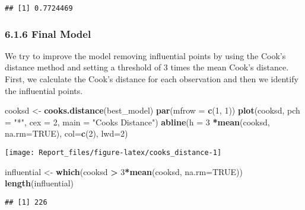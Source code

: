 \documentclass[
]{article}
\newenvironment{Shaded}{\begin{snugshade}}{\end{snugshade}}
\newcommand{\AttributeTok}[1]{\textcolor[rgb]{0.13,0.29,0.53}{#1}}
\newcommand{\ConstantTok}[1]{\textcolor[rgb]{0.56,0.35,0.01}{#1}}
\newcommand{\DecValTok}[1]{\textcolor[rgb]{0.00,0.00,0.81}{#1}}
\newcommand{\FunctionTok}[1]{\textcolor[rgb]{0.13,0.29,0.53}{\textbf{#1}}}
\newcommand{\NormalTok}[1]{#1}
\newcommand{\OtherTok}[1]{\textcolor[rgb]{0.56,0.35,0.01}{#1}}
\newcommand{\SpecialCharTok}[1]{\textcolor[rgb]{0.81,0.36,0.00}{\textbf{#1}}}
\newcommand{\StringTok}[1]{\textcolor[rgb]{0.31,0.60,0.02}{#1}}
\begin{document}
\begin{verbatim}
## [1] 0.7724469
\end{verbatim}

\hypertarget{final-model}{%
\subsubsection{6.1.6 Final Model}\label{final-model}}

We try to improve the model removing influential points by using the
Cook's distance method and setting a threshold of 3 times the mean
Cook's distance. First, we calculate the Cook's distance for each
observation and then we identify the influential points.

\begin{Shaded}
\begin{Highlighting}[]
\NormalTok{cooksd }\OtherTok{\textless{}{-}} \FunctionTok{cooks.distance}\NormalTok{(best\_model)}
\FunctionTok{par}\NormalTok{(}\AttributeTok{mfrow =} \FunctionTok{c}\NormalTok{(}\DecValTok{1}\NormalTok{, }\DecValTok{1}\NormalTok{))}
\FunctionTok{plot}\NormalTok{(cooksd, }\AttributeTok{pch =} \StringTok{"*"}\NormalTok{, }\AttributeTok{cex =} \DecValTok{2}\NormalTok{, }\AttributeTok{main =} \StringTok{"Cook\textquotesingle{}s Distance"}\NormalTok{)}
\FunctionTok{abline}\NormalTok{(}\AttributeTok{h =} \DecValTok{3} \SpecialCharTok{*}\FunctionTok{mean}\NormalTok{(cooksd, }\AttributeTok{na.rm=}\ConstantTok{TRUE}\NormalTok{),  }\AttributeTok{col=}\FunctionTok{c}\NormalTok{(}\DecValTok{2}\NormalTok{), }\AttributeTok{lwd=}\DecValTok{2}\NormalTok{)}
\end{Highlighting}
\end{Shaded}

\begin{center}\texttt{[image: Report\_files/figure-latex/cooks\_distance-1]} \end{center}

\begin{Shaded}
\begin{Highlighting}[]
\NormalTok{influential }\OtherTok{\textless{}{-}} \FunctionTok{which}\NormalTok{(cooksd }\SpecialCharTok{\textgreater{}} \DecValTok{3}\SpecialCharTok{*}\FunctionTok{mean}\NormalTok{(cooksd, }\AttributeTok{na.rm=}\ConstantTok{TRUE}\NormalTok{))}
\FunctionTok{length}\NormalTok{(influential)}
\end{Highlighting}
\end{Shaded}

\begin{verbatim}
## [1] 226
\end{verbatim}
\end{document}
